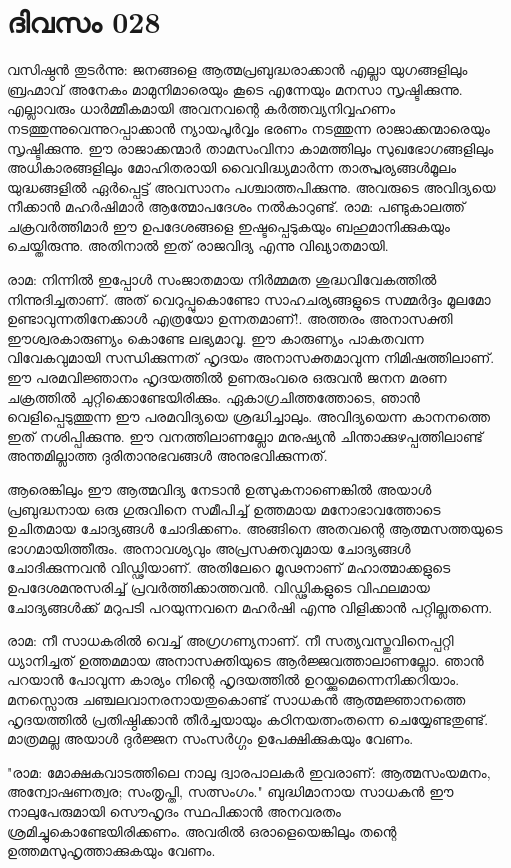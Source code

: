  
\section{ദിവസം 028}


വസിഷ്ഠന്‍ തുടര്‍ന്നു: ജനങ്ങളെ ആത്മപ്രബുദ്ധരാക്കാന്‍ എല്ലാ യുഗങ്ങളിലും ബ്രഹ്മാവ്‌ അനേകം മാമുനിമാരെയും കൂടെ എന്നേയും മനസാ സൃഷ്ടിക്കുന്നു. എല്ലാവരും ധാര്‍മ്മീകമായി അവനവന്റെ കര്‍ത്തവ്യനിവ്വഹണം നടത്തുന്നുവെന്നുറപ്പാക്കാന്‍ ന്യായപൂര്‍വ്വം ഭരണം നടത്തുന്ന രാജാക്കന്മാരെയും സൃഷ്ടിക്കുന്നു. ഈ രാജാക്കന്മാര്‍ താമസംവിനാ കാമത്തിലും സുഖഭോഗങ്ങളിലും അധികാരങ്ങളിലും മോഹിതരായി വൈവിദ്ധ്യമാര്‍ന്ന താത്പ്പര്യങ്ങള്‍മൂലം യുദ്ധങ്ങളില്‍ ഏര്‍പ്പെട്ട്‌ അവസാനം പശ്ചാത്തപിക്കുന്നു. അവരുടെ അവിദ്യയെ നീക്കാന്‍ മഹര്‍ഷിമാര്‍ ആത്മോപദേശം നല്‍കാറുണ്ട്‌. രാമ: പണ്ടുകാലത്ത്‌ ചക്രവര്‍ത്തിമാര്‍ ഈ ഉപദേശങ്ങളെ ഇഷ്ടപ്പെടുകയും ബഹുമാനിക്കുകയും ചെയ്തിരുന്നു. അതിനാല്‍ ഇത്‌ രാജവിദ്യ എന്നു വിഖ്യാതമായി.

രാമ: നിന്നില്‍ ഇപ്പോള്‍ സംജാതമായ നിര്‍മ്മമത ശുദ്ധവിവേകത്തില്‍ നിന്നുദിച്ചതാണ്‌. അത്‌ വെറുപ്പുകൊണ്ടോ സാഹചര്യങ്ങളുടെ സമ്മര്‍ദ്ദം മൂലമോ ഉണ്ടാവുന്നതിനേക്കാള്‍ എത്രയോ ഉന്നതമാണ്‌!. അത്തരം അനാസക്തി ഈശ്വരകാരുണ്യം കൊണ്ടേ ലഭ്യമാവൂ. ഈ കാരുണ്യം പാകതവന്ന വിവേകവുമായി സന്ധിക്കുന്നത്‌   ഹൃദയം അനാസക്തമാവുന്ന നിമിഷത്തിലാണ്‌. ഈ പരമവിജ്ഞാനം ഹൃദയത്തില്‍ ഉണരുംവരെ ഒരുവന്‍ ജനന മരണ ചക്രത്തില്‍ ചുറ്റിക്കൊണ്ടേയിരിക്കും. ഏകാഗ്രചിത്തത്തോടെ, ഞാന്‍ വെളിപ്പെടുത്തുന്ന ഈ പരമവിദ്യയെ  ശ്രദ്ധിച്ചാലും. അവിദ്യയെന്ന കാനനത്തെ ഇത്‌ നശിപ്പിക്കുന്നു. ഈ വനത്തിലാണല്ലോ മനുഷ്യന്‍ ചിന്താക്കുഴപ്പത്തിലാണ്ട്‌ അന്തമില്ലാത്ത ദുരിതാനുഭവങ്ങള്‍ അനുഭവിക്കുന്നത്‌. 

ആരെങ്കിലും ഈ ആത്മവിദ്യ നേടാന്‍ ഉത്സുകനാണെങ്കില്‍ അയാള്‍ പ്രബുദ്ധനായ ഒരു ഗുരുവിനെ സമീപിച്ച്‌ ഉത്തമായ മനോഭാവത്തോടെ ഉചിതമായ ചോദ്യങ്ങള്‍ ചോദിക്കണം. അങ്ങിനെ അതവന്റെ ആത്മസത്തയുടെ ഭാഗമായിത്തീരും. അനാവശ്യവും അപ്രസക്തവുമായ ചോദ്യങ്ങള്‍ ചോദിക്കുന്നവന്‍ വിഡ്ഢിയാണ്‌. അതിലേറെ മൂഢനാണ്‌ മഹാത്മാക്കളുടെ ഉപദേശമനുസരിച്ച്‌ പ്രവര്‍ത്തിക്കാത്തവന്‍. വിഡ്ഢികളുടെ വിഫലമായ ചോദ്യങ്ങള്‍ക്ക്‌ മറുപടി പറയുന്നവനെ മഹര്‍ഷി എന്നു വിളിക്കാന്‍ പറ്റില്ലതന്നെ.

രാമ: നീ സാധകരില്‍ വെച്ച്‌ അഗ്രഗണ്യനാണ്‌. നീ സത്യവസ്തുവിനെപ്പറ്റി ധ്യാനിച്ചത്‌ ഉത്തമമായ അനാസക്തിയുടെ ആര്‍ജ്ജവത്താലാണല്ലോ. ഞാന്‍ പറയാന്‍ പോവുന്ന കാര്യം നിന്റെ ഹൃദയത്തില്‍ ഉറയ്ക്കുമെന്നെനിക്കറിയാം. മനസ്സൊരു ചഞ്ചലവാനരനായതുകൊണ്ട്‌ സാധകന്‍ ആത്മജ്ഞാനത്തെ ഹൃദയത്തില്‍ പ്രതിഷ്ഠിക്കാന്‍ തീര്‍ച്ചയായും കഠിനയത്നംതന്നെ ചെയ്യേണ്ടതുണ്ട്‌. മാത്രമല്ല അയാള്‍ ദുര്‍ജ്ജന സംസര്‍ഗ്ഗം ഉപേക്ഷിക്കുകയും വേണം.

"രാമ: മോക്ഷകവാടത്തിലെ നാലു ദ്വാരപാലകര്‍ ഇവരാണ്‌: ആത്മസംയമനം, അന്വോഷണത്വര; സംതൃപ്തി,  സത്സംഗം." ബുദ്ധിമാനായ സാധകന്‍ ഈ നാലുപേരുമായി സൌഹൃദം സ്ഥപിക്കാന്‍ അനവരതം ശ്രമിച്ചുകൊണ്ടേയിരിക്കണം. അവരില്‍ ഒരാളെയെങ്കിലും തന്റെ ഉത്തമസുഹൃത്താക്കുകയും വേണം. 

